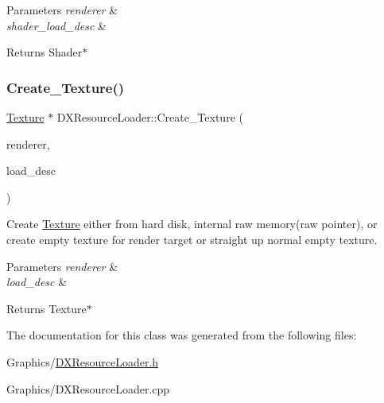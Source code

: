 \begin{DoxyParams}{Parameters}
{\em renderer} & \\
\hline
{\em shader\+\_\+load\+\_\+desc} & \\
\hline
\end{DoxyParams}
\begin{DoxyReturn}{Returns}
Shader$\ast$ 
\end{DoxyReturn}
\mbox{\label{classDXResourceLoader_a8c8513cb2314e5d67aa60ef0d8c0d039}} 
\subsubsection{\texorpdfstring{Create\+\_\+\+Texture()}{Create\_Texture()}}
{\footnotesize\ttfamily \hyperlink{classTexture}{Texture} $\ast$ D\+X\+Resource\+Loader\+::\+Create\+\_\+\+Texture (\begin{DoxyParamCaption}\item[{\hyperlink{classDXRenderer}{D\+X\+Renderer} $\ast$}]{renderer,  }\item[{\hyperlink{structTextureLoadDesc}{Texture\+Load\+Desc} \&}]{load\+\_\+desc }\end{DoxyParamCaption})\hspace{0.3cm}{\ttfamily [static]}}



Create \hyperlink{classTexture}{Texture} either from hard disk, internal raw memory(raw pointer), or create empty texture for render target or straight up normal empty texture. 


\begin{DoxyParams}{Parameters}
{\em renderer} & \\
\hline
{\em load\+\_\+desc} & \\
\hline
\end{DoxyParams}
\begin{DoxyReturn}{Returns}
Texture$\ast$ 
\end{DoxyReturn}


The documentation for this class was generated from the following files\+:\begin{DoxyCompactItemize}
\item 
Graphics/\hyperlink{DXResourceLoader_8h}{D\+X\+Resource\+Loader.\+h}\item 
Graphics/D\+X\+Resource\+Loader.\+cpp\end{DoxyCompactItemize}
